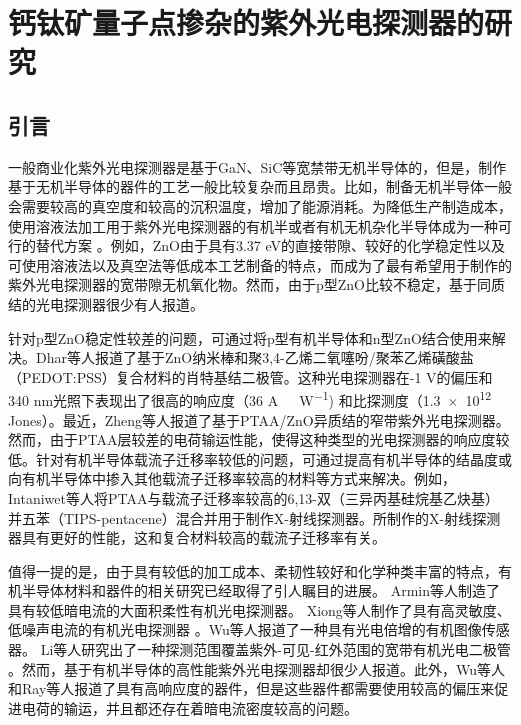 \documentclass[forlib]{WHUMaster}   %
\begin{document}
{%

\chapter{钙钛矿量子点掺杂的紫外光电探测器的研究}

\section{引言}

一般商业化紫外光电探测器是基于GaN、SiC等宽禁带无机半导体的，但是，制作基于无机半导体的器件的工艺一般比较复杂而且昂贵。比如，制备无机半导体一般会需要较高的真空度和较高的沉积温度，增加了能源消耗\cite{RN131,RN25}。为降低生产制造成本，使用溶液法加工用于紫外光电探测器的有机半或者有机无机杂化半导体成为一种可行的替代方案\cite{RN37,RN38,RN39} 。例如，ZnO由于具有3.37 eV的直接带隙、较好的化学稳定性以及可使用溶液法以及真空法等低成本工艺制备的特点，而成为了最有希望用于制作的紫外光电探测器的宽带隙无机氧化物\cite{RN8,RN7}。然而，由于p型ZnO比较不稳定，基于同质结的光电探测器很少有人报道\cite{RN25}。

针对p型ZnO稳定性较差的问题，可通过将p型有机半导体和n型ZnO结合使用来解决。Dhar等人报道了基于ZnO纳米棒和聚3,4-乙烯二氧噻吩/聚苯乙烯磺酸盐（PEDOT:PSS）复合材料的肖特基结二极管\cite{RN28}。这种光电探测器在-1 V的偏压和340 nm光照下表现出了很高的响应度（{36} \si{A\ W^{-1}}) 和比探测度（\num{1.3e12} Jones）。最近，Zheng等人报道了基于PTAA/ZnO异质结的窄带紫外光电探测器\cite{RN25}。然而，由于PTAA层较差的电荷输运性能，使得这种类型的光电探测器的响应度较低。针对有机半导体载流子迁移率较低的问题，可通过提高有机半导体的结晶度或向有机半导体中掺入其他载流子迁移率较高的材料等方式来解决\cite{RN183}。例如，Intaniwet等人将PTAA与载流子迁移率较高的6,13-双（三异丙基硅烷基乙炔基）并五苯（TIPS-pentacene）混合并用于制作X-射线探测器\cite{RN34}。所制作的X-射线探测器具有更好的性能，这和复合材料较高的载流子迁移率有关。

值得一提的是，由于具有较低的加工成本、柔韧性较好和化学种类丰富的特点，有机半导体材料和器件的相关研究已经取得了引人瞩目的进展\cite{RN73,RN41,RN44}。 Armin等人制造了具有较低暗电流的大面积柔性有机光电探测器\cite{RN29}。 Xiong等人制作了具有高灵敏度、低噪声电流的有机光电探测器\cite{RN35} 。Wu等人报道了一种具有光电倍增的有机图像传感器\cite{RN30}。 Li等人研究出了一种探测范围覆盖紫外-可见-红外范围的宽带有机光电二极管\cite{RN1} 。然而，基于有机半导体的高性能紫外光电探测器却很少人报道。此外，Wu\cite{RN31}等人和Ray\cite{RN32}等人报道了具有高响应度的器件，但是这些器件都需要使用较高的偏压来促进电荷的输运，并且都还存在着暗电流密度较高的问题。

}
\end{document}
